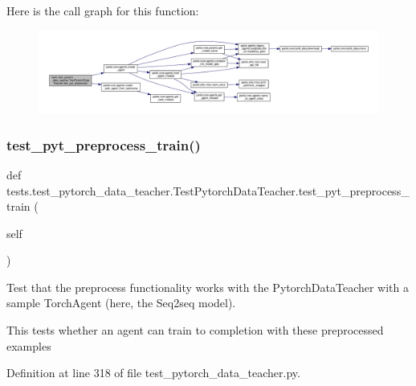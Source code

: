 Here is the call graph for this function\+:
\nopagebreak
\begin{figure}[H]
\begin{center}
\leavevmode
\includegraphics[width=350pt]{classtests_1_1test__pytorch__data__teacher_1_1TestPytorchDataTeacher_ad9d9065300215a4afeb0589192b5ba05_cgraph}
\end{center}
\end{figure}
\mbox{\label{classtests_1_1test__pytorch__data__teacher_1_1TestPytorchDataTeacher_a3ba46374c7e9068827af1b90f35c832e}} 
\subsubsection{\texorpdfstring{test\+\_\+pyt\+\_\+preprocess\+\_\+train()}{test\_pyt\_preprocess\_train()}}
{\footnotesize\ttfamily def tests.\+test\+\_\+pytorch\+\_\+data\+\_\+teacher.\+Test\+Pytorch\+Data\+Teacher.\+test\+\_\+pyt\+\_\+preprocess\+\_\+train (\begin{DoxyParamCaption}\item[{}]{self }\end{DoxyParamCaption})}

\begin{DoxyVerb}Test that the preprocess functionality works with the PytorchDataTeacher
with a sample TorchAgent (here, the Seq2seq model).

This tests whether an agent can train to completion with
these preprocessed examples
\end{DoxyVerb}
 

Definition at line 318 of file test\+\_\+pytorch\+\_\+data\+\_\+teacher.\+py.



